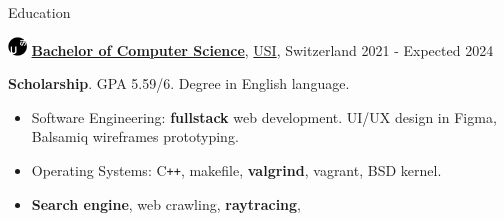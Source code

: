 \documentclass{cv} %
\def\titlelistvspace{-0.15cm}
\begin{document}
\begin{rSection}{Education}

    \includegraphics[width=0.5cm, trim={0cm 5cm 0cm 0cm}]{usi-icon.png}
    {\bf \underline{Bachelor of Computer Science}},
    \href{https://www.usi.ch/en}{USI}, Switzerland
    \hfill {2021 - Expected 2024}

    \textbf{Scholarship}. GPA 5.59/6. Degree in English language.

    \vspace{\titlelistvspace}\begin{itemize}
        \itemsep -3pt {}
        \item Software Engineering: \textbf{fullstack} web development.
              UI/UX design in Figma, Balsamiq wireframes prototyping.
        \item Operating Systems:
              C\texttt{++},
              makefile,
              \textbf{valgrind},
              vagrant,
              BSD kernel.
        \item \textbf{Search engine},
              web crawling,
              \textbf{raytracing},

\end{itemize}
\end{rSection}
\end{document}
